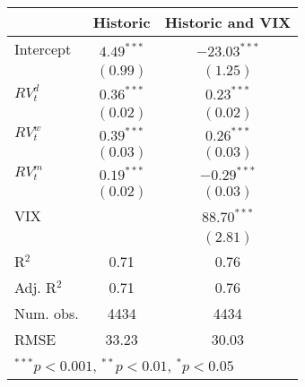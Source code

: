 
\begin{tabular}{l c c }
\hline
 & Historic & Historic and VIX \\
\hline
Intercept    & $4.49^{***}$ & $-23.03^{***}$ \\
             & $(0.99)$     & $(1.25)$       \\
$RV_{t}^{d}$ & $0.36^{***}$ & $0.23^{***}$   \\
             & $(0.02)$     & $(0.02)$       \\
$RV_{t}^{w}$ & $0.39^{***}$ & $0.26^{***}$   \\
             & $(0.03)$     & $(0.03)$       \\
$RV_{t}^{m}$ & $0.19^{***}$ & $-0.29^{***}$  \\
             & $(0.02)$     & $(0.03)$       \\
VIX          &              & $88.70^{***}$  \\
             &              & $(2.81)$       \\
\hline
R$^2$        & 0.71         & 0.76           \\
Adj. R$^2$   & 0.71         & 0.76           \\
Num. obs.    & 4434         & 4434           \\
RMSE         & 33.23        & 30.03          \\
\hline
\multicolumn{3}{l}{\scriptsize{$^{***}p<0.001$, $^{**}p<0.01$, $^*p<0.05$}}
\end{tabular}

